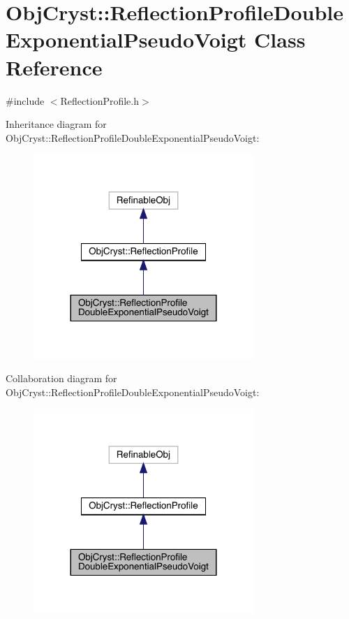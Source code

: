 \hypertarget{class_obj_cryst_1_1_reflection_profile_double_exponential_pseudo_voigt}{}\section{Obj\+Cryst\+::Reflection\+Profile\+Double\+Exponential\+Pseudo\+Voigt Class Reference}
\label{class_obj_cryst_1_1_reflection_profile_double_exponential_pseudo_voigt}


{\ttfamily \#include $<$Reflection\+Profile.\+h$>$}



Inheritance diagram for Obj\+Cryst\+::Reflection\+Profile\+Double\+Exponential\+Pseudo\+Voigt\+:
\nopagebreak
\begin{figure}[H]
\begin{center}
\leavevmode
\includegraphics[width=236pt]{class_obj_cryst_1_1_reflection_profile_double_exponential_pseudo_voigt__inherit__graph}
\end{center}
\end{figure}


Collaboration diagram for Obj\+Cryst\+::Reflection\+Profile\+Double\+Exponential\+Pseudo\+Voigt\+:
\nopagebreak
\begin{figure}[H]
\begin{center}
\leavevmode
\includegraphics[width=236pt]{class_obj_cryst_1_1_reflection_profile_double_exponential_pseudo_voigt__coll__graph}
\end{center}
\end{figure}
